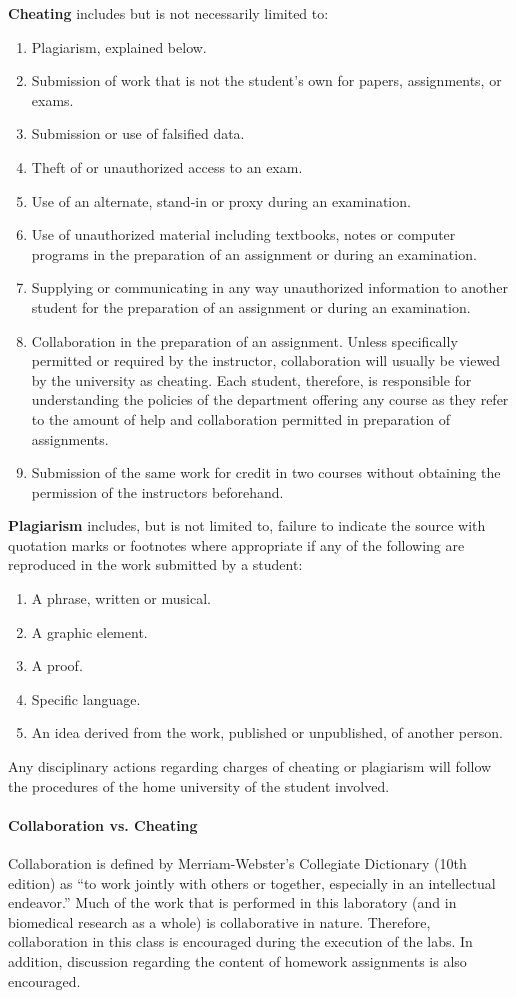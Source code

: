 \textbf{Cheating} includes but is not necessarily limited to:
\begin{enumerate}
\item Plagiarism, explained below.
\item Submission of work that is not the student's own for papers, assignments, or exams.
\item Submission or use of falsified data.
\item Theft of or unauthorized access to an exam.
\item Use of an alternate, stand-in or proxy during an examination.
\item Use of unauthorized material including textbooks, notes or computer programs in the preparation of an assignment or during an examination.
\item Supplying or communicating in any way unauthorized information to another student for the preparation of an assignment or during an examination.
\item Collaboration in the preparation of an assignment. Unless specifically permitted or required by the instructor, collaboration will usually be viewed by the university as cheating. Each student, therefore, is responsible for understanding the policies of the department offering any course as they refer to the amount of help and collaboration permitted in preparation of assignments.
\item Submission of the same work for credit in two courses without obtaining the permission of the instructors beforehand.
\end{enumerate}

\textbf{Plagiarism} includes, but is not limited to, failure to indicate the source with quotation marks or footnotes where appropriate if any of the following are reproduced in the work submitted by a student:
\begin{enumerate}
\item A phrase, written or musical.
\item A graphic element.
\item A proof.
\item Specific language.
\item An idea derived from the work, published or unpublished, of another person.
\end{enumerate}
Any disciplinary actions regarding charges of cheating or plagiarism will follow the procedures of the home university of the student involved.
 
\paragraph{Collaboration vs. Cheating}
Collaboration is defined by Merriam-Webster’s Collegiate Dictionary (10th edition) as 
“to work jointly with others or together, especially in an intellectual endeavor.” 
Much of the work that is performed in this laboratory (and in biomedical research as a whole) is collaborative in nature. 
Therefore, collaboration in this class is encouraged during the execution of the labs. 
In addition, discussion regarding the content of homework assignments is also encouraged.
 
